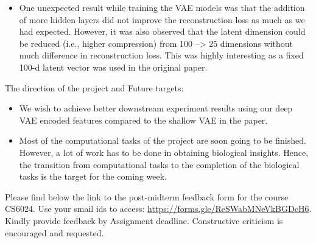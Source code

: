 \documentclass[solution,addpoints,12pt]{exam}
\begin{document}
\begin{questions}
\begin{solution}
\begin{itemize}[topsep=0pt]
\item One unexpected result while training the VAE models was that the addition of more hidden layers did not improve the reconstruction loss as much as we had expected. However, it was also observed that the latent dimension could be reduced (i.e., higher compression)  from 100 --> 25 dimensions without much difference in reconstruction loss. This was highly interesting as a fixed 100-d latent vector was used in the original paper.
\end{itemize}
The direction of the project and Future targets:
\begin{itemize}[topsep=0pt]
\itemsep0em 
\item We wish to achieve better downstream experiment results using our deep VAE encoded features compared to the shallow VAE in the paper.
\item Most of the computational tasks of the project are soon going to be finished. However, a lot of work has to be done in obtaining biological insights. Hence, the transition from computational tasks to the completion of the biological tasks is the target for the coming week. 
\end{itemize}
\end{solution}

\question[2] Please find below the link to the post-midterm feedback form for the course CS6024. Use your smail ids to access: \url{https://forms.gle/ReSWabMNeVkBGDcH6}. Kindly provide feedback by Assignment deadline. Constructive criticism is encouraged and requested.



\end{questions}
\end{document}
